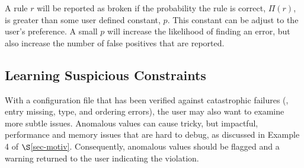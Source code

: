 



A rule $r$ will be reported as broken if the probability the rule is
correct, $\Pi(r)$, is greater than some user defined constant, $p$. This
constant can be adjust to the user's preference. A small $p$ will
increase the likelihood of finding an error, but also increase the
number of false positives that are reported.



\subsection{Learning Suspicious Constraints}
\label{subsec-constraints}

With a configuration file that has been verified against catastrophic
failures (\eg, entry missing, type, and ordering errors), 
the user may also want to examine more subtle issues.
Anomalous values can cause tricky, but impactful, performance and memory
issues that are hard to debug, as discussed in Example 4 of 
$\S$\ref{sec-motiv}. 
Consequently, anomalous values should be flagged and a warning returned
to the user indicating the violation.

